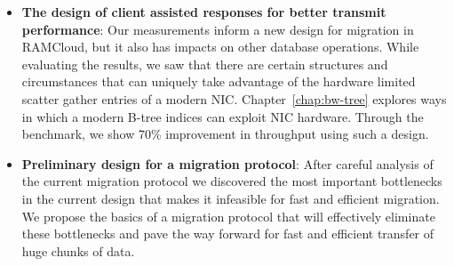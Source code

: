 \begin{itemize}
\item{\textbf{The design of client assisted responses for better transmit performance}}: Our measurements inform a new design for migration in RAMCloud, but it also has impacts on other database operations.
 While evaluating the results, we saw that there are certain structures and circumstances that can uniquely take advantage of the hardware limited scatter gather entries of a modern NIC.
 Chapter~\ref{chap:bw-tree} explores ways in which a modern B-tree indices can exploit NIC hardware.
 Through the benchmark, we show 70\% improvement in throughput using such a design.


\item{\textbf{Preliminary design for a migration protocol}}: After careful analysis of the current migration protocol
 we discovered the most important bottlenecks in the current design that makes it infeasible for fast and efficient migration.
 We propose the basics of a migration protocol that will effectively eliminate these bottlenecks and pave the way
 forward for fast and efficient transfer of huge chunks of data.
\end{itemize}

